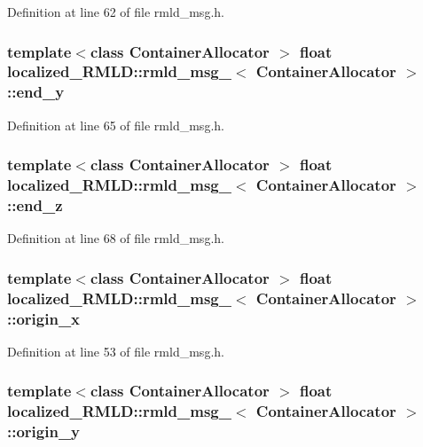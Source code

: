 Definition at line 62 of file rmld\_\-msg.h.

\subsubsection[{end\_\-y}]{\setlength{\rightskip}{0pt plus 5cm}template$<$class ContainerAllocator $>$ float {\bf localized\_\-RMLD::rmld\_\-msg\_\-}$<$ ContainerAllocator $>$::{\bf end\_\-y}}\label{structlocalized__RMLD_1_1rmld__msg___ab4111462a959913becef6203aa075572}


Definition at line 65 of file rmld\_\-msg.h.

\subsubsection[{end\_\-z}]{\setlength{\rightskip}{0pt plus 5cm}template$<$class ContainerAllocator $>$ float {\bf localized\_\-RMLD::rmld\_\-msg\_\-}$<$ ContainerAllocator $>$::{\bf end\_\-z}}\label{structlocalized__RMLD_1_1rmld__msg___a246f3616e46e951ed6883bf1d6b6babe}


Definition at line 68 of file rmld\_\-msg.h.

\subsubsection[{origin\_\-x}]{\setlength{\rightskip}{0pt plus 5cm}template$<$class ContainerAllocator $>$ float {\bf localized\_\-RMLD::rmld\_\-msg\_\-}$<$ ContainerAllocator $>$::{\bf origin\_\-x}}\label{structlocalized__RMLD_1_1rmld__msg___a2af9c5178ebf2fc154c87dd20278eafa}


Definition at line 53 of file rmld\_\-msg.h.

\subsubsection[{origin\_\-y}]{\setlength{\rightskip}{0pt plus 5cm}template$<$class ContainerAllocator $>$ float {\bf localized\_\-RMLD::rmld\_\-msg\_\-}$<$ ContainerAllocator $>$::{\bf origin\_\-y}}\label{structlocalized__RMLD_1_1rmld__msg___ac7c94fbe8d3881cdbdbc983508e3edb3}


